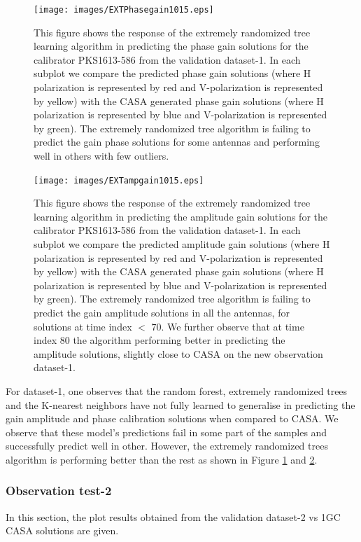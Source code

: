 \begin{figure}[H]
    \texttt{[image: images/EXTPhasegain1015.eps]}
    \caption{This figure shows the response of the extremely randomized tree learning algorithm in predicting the phase gain solutions for the calibrator PKS1613-586 from the validation dataset-1. In each subplot we compare the predicted phase gain solutions (where H polarization is represented by red and V-polarization is represented by yellow) with the CASA generated phase gain solutions (where H polarization is represented by blue and V-polarization is represented by green). The extremely randomized tree algorithm is failing to predict the gain phase solutions for some antennas and performing well in others with few outliers.}
    \label{obs8}
\end{figure}

\begin{figure}[H]
    \texttt{[image: images/EXTampgain1015.eps]}
    \caption{This figure shows the response of the extremely randomized tree learning algorithm in predicting the amplitude gain solutions for the calibrator PKS1613-586 from the validation dataset-1. In each subplot we compare the predicted amplitude gain solutions (where H polarization is represented by red and V-polarization is represented by yellow) with the CASA generated phase gain solutions (where H polarization is represented by blue and V-polarization is represented by green). The extremely randomized tree algorithm is failing to predict the gain amplitude solutions in all the antennas, for solutions at time index $<$ 70. We further observe that at time index $80$ the algorithm performing better in predicting the amplitude solutions, slightly close to CASA on the new observation dataset-1.}
     \label{ea2}
\end{figure}

For dataset-1, one observes that the random forest, extremely randomized trees and the K-nearest neighbors have not fully learned to generalise in predicting the gain amplitude and phase calibration solutions when compared to CASA. We observe that these model's predictions fail in some part of the samples and successfully predict  well in other. However, the extremely randomized trees algorithm is performing better than the rest as shown in Figure \ref{obs8} and \ref{ea2}.

\subsubsection{Observation test-2}
In this section, the plot results obtained from the validation dataset-2 vs 1GC CASA solutions are given. 


